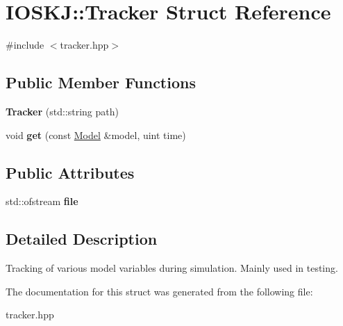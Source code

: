 \hypertarget{structIOSKJ_1_1Tracker}{\section{I\-O\-S\-K\-J\-:\-:Tracker Struct Reference}
\label{structIOSKJ_1_1Tracker}
}


{\ttfamily \#include $<$tracker.\-hpp$>$}

\subsection*{Public Member Functions}
\begin{DoxyCompactItemize}
\item 
\hypertarget{structIOSKJ_1_1Tracker_afa56ecd201a5cf1c7b5830098b3dc6ef}{{\bfseries Tracker} (std\-::string path)}\label{structIOSKJ_1_1Tracker_afa56ecd201a5cf1c7b5830098b3dc6ef}

\item 
\hypertarget{structIOSKJ_1_1Tracker_a01092eb7b77b78fce12d15a13ebd5e51}{void {\bfseries get} (const \hyperlink{classIOSKJ_1_1Model}{Model} \&model, uint time)}\label{structIOSKJ_1_1Tracker_a01092eb7b77b78fce12d15a13ebd5e51}

\end{DoxyCompactItemize}
\subsection*{Public Attributes}
\begin{DoxyCompactItemize}
\item 
\hypertarget{structIOSKJ_1_1Tracker_ad2bef8b4314ba5399e42e251ebecf129}{std\-::ofstream {\bfseries file}}\label{structIOSKJ_1_1Tracker_ad2bef8b4314ba5399e42e251ebecf129}

\end{DoxyCompactItemize}


\subsection{Detailed Description}
Tracking of various model variables during simulation. Mainly used in testing. 

The documentation for this struct was generated from the following file\-:\begin{DoxyCompactItemize}
\item 
tracker.\-hpp\end{DoxyCompactItemize}

